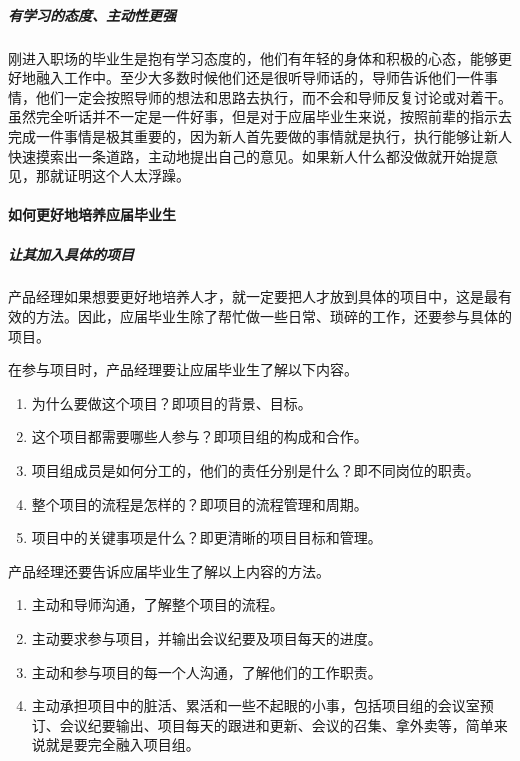 \documentclass[letterpaper,10pt,english]{sphinxmanual}
\begin{document}
\subparagraph{有学习的态度、主动性更强}
\label{\detokenize{chapter_AI_dive/develop:id5}}
刚进入职场的毕业生是抱有学习态度的，他们有年轻的身体和积极的心态，能够更好地融入工作中。至少大多数时候他们还是很听导师话的，导师告诉他们一件事情，他们一定会按照导师的想法和思路去执行，而不会和导师反复讨论或对着干。虽然完全听话并不一定是一件好事，但是对于应届毕业生来说，按照前辈的指示去完成一件事情是极其重要的，因为新人首先要做的事情就是执行，执行能够让新人快速摸索出一条道路，主动地提出自己的意见。如果新人什么都没做就开始提意见，那就证明这个人太浮躁。


\paragraph{如何更好地培养应届毕业生}
\label{\detokenize{chapter_AI_dive/develop:id6}}

\subparagraph{让其加入具体的项目}
\label{\detokenize{chapter_AI_dive/develop:id7}}
产品经理如果想要更好地培养人才，就一定要把人才放到具体的项目中，这是最有效的方法。因此，应届毕业生除了帮忙做一些日常、琐碎的工作，还要参与具体的项目。

在参与项目时，产品经理要让应届毕业生了解以下内容。
\begin{enumerate}
%
\item {} 
为什么要做这个项目？即项目的背景、目标。

\item {} 
这个项目都需要哪些人参与？即项目组的构成和合作。

\item {} 
项目组成员是如何分工的，他们的责任分别是什么？即不同岗位的职责。

\item {} 
整个项目的流程是怎样的？即项目的流程管理和周期。

\item {} 
项目中的关键事项是什么？即更清晰的项目目标和管理。

\end{enumerate}

产品经理还要告诉应届毕业生了解以上内容的方法。
\begin{enumerate}
%
\item {} 
主动和导师沟通，了解整个项目的流程。

\item {} 
主动要求参与项目，并输出会议纪要及项目每天的进度。

\item {} 
主动和参与项目的每一个人沟通，了解他们的工作职责。

\item {} 
主动承担项目中的脏活、累活和一些不起眼的小事，包括项目组的会议室预订、会议纪要输出、项目每天的跟进和更新、会议的召集、拿外卖等，简单来说就是要完全融入项目组。

\end{enumerate}
\end{document}
